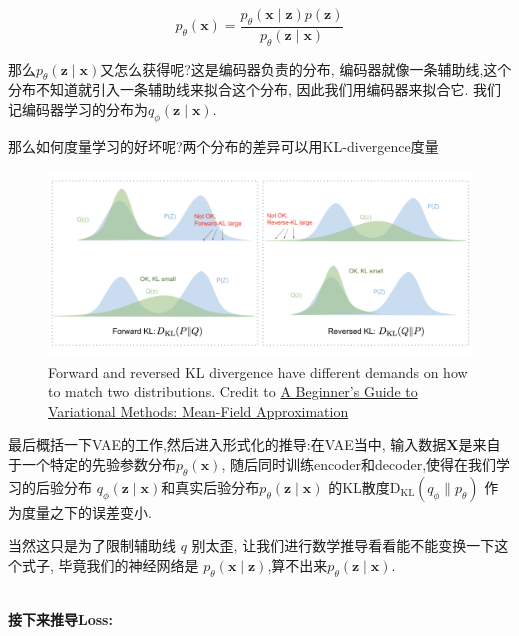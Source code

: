 	\begin{equation}
		p_{\theta}(\bm x) = \frac{p_\theta(\bm x\mid \bm z) p(\bm z)}{p_\theta(\bm z\mid \bm x)}
	\end{equation}

	那么$p_\theta(\bm z\mid \bm x)$又怎么获得呢?这是编码器负责的分布,
	编码器就像一条辅助线,这个分布不知道就引入一条辅助线来拟合这个分布,
	因此我们用编码器来拟合它.
	我们记编码器学习的分布为$q_\phi(\bm z\mid \bm x)$.
	
	那么如何度量学习的好坏呢?两个分布的差异可以用KL-divergence度量
	
	\begin{figure}[htbp]
	\centering
	\includegraphics[scale=0.1]{figures/KLdiv.png}
	\caption{Forward and reversed KL divergence have different demands on how to match two distributions. Credit to \href{blog.evjang.com/2016/08/variational-bayes.html}{A Beginner's Guide to Variational Methods: Mean-Field Approximation}}
	\end{figure}
	
	最后概括一下VAE的工作,然后进入形式化的推导:在VAE当中,
	输入数据$\bm X$是来自于一个特定的先验参数分布$p_{\theta}(\bm x)$,
	随后同时训练encoder和decoder,使得在我们学习的后验分布
	$q_\phi(\bm z\mid \bm x)$和真实后验分布$p_\theta(\bm z\mid \bm x)$
	的KL散度$\operatorname{D_{KL}}(q_\phi \parallel p_\theta)$
	作为度量之下的误差变小.
	
	当然这只是为了限制辅助线 $q$ 别太歪, 让我们进行数学推导看看能不能变换一下这个式子,
	毕竟我们的神经网络是 $p_{\theta}(\bm{x} \mid \bm{z})$,算不出来$p_\theta(\bm z\mid \bm x)$.

	\textbf{\\接下来推导Loss:}
	
